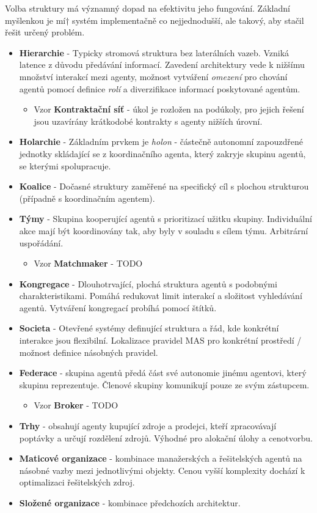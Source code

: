 Volba struktury má významný dopad na efektivitu jeho fungování. Základní myšlenkou je mí† systém implementačně co nejjednodušší, ale takový, aby stačil řešit určený problém.


\begin{itemize}
\item \textbf{Hierarchie} - Typicky stromová struktura bez laterálních vazeb. Vzniká latence z důvodu předávání informací. Zavedení architektury vede k nižšímu množství interakcí mezi agenty, možnost vytváření \textit{omezení} pro chování agentů pomocí definice \textit{rolí} a diverzifikace informací poskytované agentům.
    \begin{itemize}
        \item Vzor \textbf{Kontraktační síť} - úkol je rozložen na podúkoly, pro jejich řešení jsou uzavírány krátkodobé kontrakty s agenty nižších úrovní.
    \end{itemize}
\item \textbf{Holarchie} - Základním prvkem je \textit{holon} - částečně autonomní zapouzdřené jednotky skládající se z koordinačního agenta, který zakryje skupinu agentů, se kterými spolupracuje.
\item \textbf{Koalice} - Dočasné struktury zaměřené na specifický cíl s plochou strukturou (případně s koordinačním agentem).
\item \textbf{Týmy} - Skupina kooperující agentů s prioritizací užitku skupiny. Individuální akce mají být koordinovány tak, aby byly v souladu s cílem týmu. Arbitrární uspořádání.
    \begin{itemize}
        \item Vzor \textbf{Matchmaker} - TODO
    \end{itemize}
\item \textbf{Kongregace} - Dlouhotrvající, plochá struktura agentů s podobnými charakteristikami. Pomáhá redukovat limit interakcí a složitost vyhledávání agentů. Vytváření kongregací probíhá pomocí štítků.
\item \textbf{Societa} - Otevřené systémy definující struktura a řád, kde konkrétní interakce jsou flexibilní. Lokalizace pravidel MAS pro konkrétní prostředí / možnost definice násobných pravidel.
\item \textbf{Federace} - skupina agentů předá část své autonomie jinému agentovi, který skupinu reprezentuje. Členové skupiny komunikují pouze ze svým zástupcem.
    \begin{itemize}
        \item Vzor \textbf{Broker} - TODO
    \end{itemize}
\item \textbf{Trhy} - obsahují agenty kupující zdroje a prodejci, kteří zpracovávají poptávky a určují rozdělení zdrojů. Výhodné pro alokační úlohy a cenotvorbu.
\item \textbf{Maticové organizace} - kombinace manažerských a řešitelských agentů na násobné vazby mezi jednotlivými objekty. Cenou vyšší komplexity dochází k optimalizaci řešitelských zdroj.
\item \textbf{Složené organizace} - kombinace předchozích architektur.
\end{itemize}